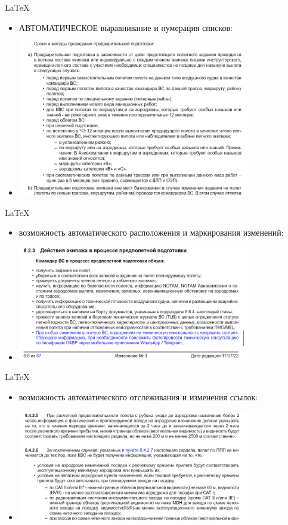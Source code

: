 \documentclass[utf8]{beamer}
\begin{document}
\begin{frame}{LaTeX}  
    \begin{itemize}
        \item <1-> АВТОМАТИЧЕСКОЕ выравнивание и нумерация списков:
        \item <2-> \includegraphics[width=0.8\textwidth]{lt02 - lists.png} 
    \end{itemize}              
\end{frame}

\begin{frame}{LaTeX}  
    \begin{itemize}
        \item <1-> возможность автоматического расположения и маркирования изменений:
        \item <2-> \includegraphics[width=0.8\textwidth]{lt03-changes.png}
    \end{itemize}              
\end{frame}

\begin{frame}{LaTeX}  
    \begin{itemize}
        \item <1-> возможность автоматического отслеживания и изменения ссылок:
        \item <2-> \includegraphics[width=0.8\textwidth]{lt04-links.png}
    \end{itemize}              
\end{frame}
\end{document}
